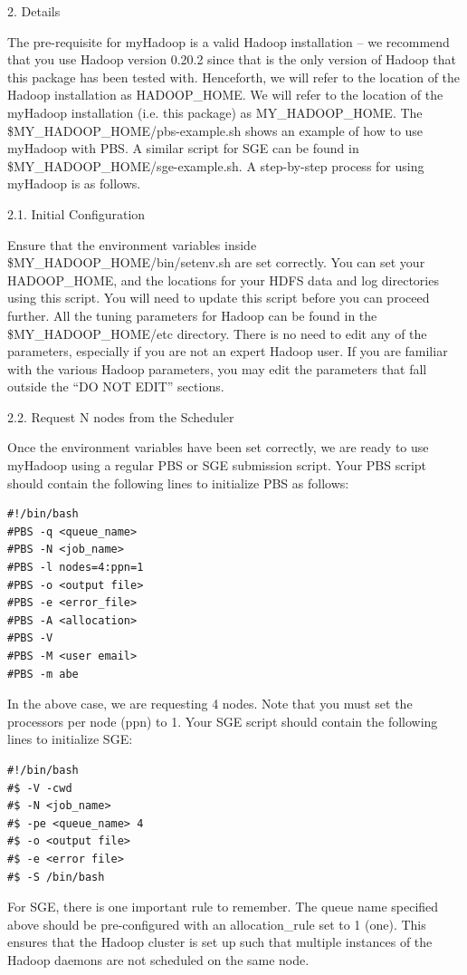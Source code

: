 \documentclass{article}
\begin{document}
2. Details

The pre-requisite for myHadoop is a valid Hadoop installation – we recommend that you
use Hadoop version 0.20.2 since that is the only version of Hadoop that this package has
been tested with. Henceforth, we will refer to the location of the Hadoop installation as
HADOOP\_HOME. We will refer to the location of the myHadoop installation (i.e. this
package) as MY\_HADOOP\_HOME. The \$MY\_HADOOP\_HOME/pbs-example.sh shows
an example of how to use myHadoop with PBS. A similar script for SGE can be found in
\$MY\_HADOOP\_HOME/sge-example.sh.
A step-by-step process for using myHadoop is as follows.

2.1. Initial Configuration

Ensure that the environment variables inside \$MY\_HADOOP\_HOME/bin/setenv.sh are
set correctly. You can set your HADOOP\_HOME, and the locations for your HDFS data
and log directories using this script. You will need to update this script before you can
proceed further.
All the tuning parameters for Hadoop can be found in the \$MY\_HADOOP\_HOME/etc
directory. There is no need to edit any of the parameters, especially if you are not an
expert Hadoop user. If you are familiar with the various Hadoop parameters, you may
edit the parameters that fall outside the “DO NOT EDIT” sections.

2.2. Request N nodes from the Scheduler

Once the environment variables have been set correctly, we are ready to use myHadoop
using a regular PBS or SGE submission script. Your PBS script should contain the
following lines to initialize PBS as follows:

\begin{verbatim}
#!/bin/bash
#PBS -q <queue_name>
#PBS -N <job_name>
#PBS -l nodes=4:ppn=1
#PBS -o <output file>
#PBS -e <error_file>
#PBS -A <allocation>
#PBS -V
#PBS -M <user email>
#PBS -m abe
\end{verbatim}

In the above case, we are requesting 4 nodes. Note that you must set the processors per
node (ppn) to 1.
Your SGE script should contain the following lines to initialize SGE:

\begin{verbatim}
#!/bin/bash
#$ -V -cwd
#$ -N <job_name>
#$ -pe <queue_name> 4
#$ -o <output file>
#$ -e <error file>
#$ -S /bin/bash
\end{verbatim}

For SGE, there is one important rule to remember. The queue name specified above
should be pre-configured with an allocation\_rule set to 1 (one). This ensures that the
Hadoop cluster is set up such that multiple instances of the Hadoop daemons are not
scheduled on the same node.
\end{document}
